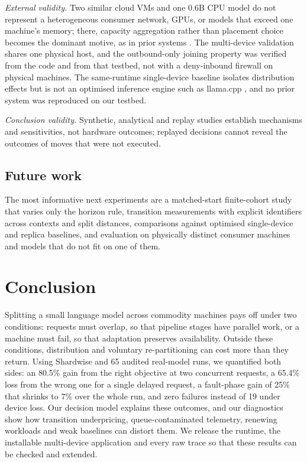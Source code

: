 \documentclass[preprint,12pt]{elsarticle}
\begin{document}
\emph{External validity.} Two similar cloud VMs and one 0.6B CPU model
do not represent a heterogeneous consumer network, GPUs, or models that
exceed one machine's memory; there, capacity aggregation rather than
placement choice becomes the dominant motive, as in prior systems
\citep{tpi2025, prima2026}. The multi-device validation shares one
physical host, and the outbound-only joining property was verified from
the code and from that testbed, not with a deny-inbound firewall on
physical machines. The same-runtime single-device baseline isolates
distribution effects but is not an optimised inference engine such as
llama.cpp \citep{gerganov2023llamacpp}, and no prior system was
reproduced on our testbed.

\emph{Conclusion validity.} Synthetic, analytical and replay studies
establish mechanisms and sensitivities, not hardware outcomes; replayed
decisions cannot reveal the outcomes of moves that were not executed.

\hypertarget{future-work}{%
\subsection{Future work}\label{future-work}}

The most informative next experiments are a matched-start finite-cohort
study that varies only the horizon rule, transition measurements with
explicit identifiers across contexts and split distances, comparisons
against optimised single-device and replica baselines, and evaluation on
physically distinct consumer machines and models that do not fit on one
of them.

\hypertarget{conclusion}{%
\section{Conclusion}\label{conclusion}}

Splitting a small language model across commodity machines pays off
under two conditions: requests must overlap, so that pipeline stages
have parallel work, or a machine must fail, so that adaptation preserves
availability. Outside these conditions, distribution and voluntary
re-partitioning can cost more than they return. Using Shardwise and 65
audited real-model runs, we quantified both sides: an 80.5\% gain from
the right objective at two concurrent requests, a 65.4\% loss from the
wrong one for a single delayed request, a fault-phase gain of 25\% that
shrinks to 7\% over the whole run, and zero failures instead of 19 under
device loss. Our decision model explains these outcomes, and our
diagnostics show how transition underpricing, queue-contaminated
telemetry, renewing workloads and weak baselines can distort them. We
release the runtime, the installable multi-device application and every
raw trace so that these results can be checked and extended.
\end{document}
